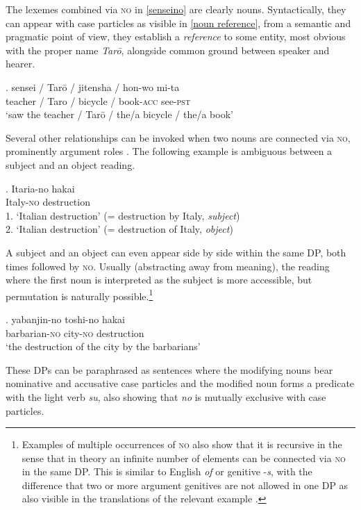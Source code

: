 \documentclass [output=book,colorlinks,citecolor=brown]{langscibook}
\begin{document}
The lexemes combined via \textsc{no} in \ref{senseino} are clearly nouns. Syntactically, they can appear with case particles as visible in \ref{noun reference}, from a semantic and pragmatic point of view, they establish a \textit{reference} to some entity, most obvious with the proper name \textit{Tarō}, alongside common ground between speaker and hearer.

\exg. sensei / Tarō / jitensha / hon-wo mi-ta\\
teacher / Taro / bicycle / book-\textsc{acc} see-\textsc{pst}\\
`saw the teacher / Tarō / the/a bicycle / the/a book’ \label{noun reference}

Several other relationships can be invoked when two nouns are connected via \textsc{no}, prominently argument roles \citep{murasugi:1991:noun}. The following example is ambiguous between a subject and an object reading.

\exg. Itaria-no hakai\\
Italy-\textsc{no} destruction\\
1. `Italian destruction' \null \hfill (= destruction by Italy, \textit{subject})\\
2. `Italian destruction' \null \hfill (= destruction of Italy, \textit{object})

A subject and an object can even appear side by side within the same DP, both times followed by \textsc{no}. Usually (abstracting away from meaning), the reading where the first noun is interpreted as the subject is more accessible, but permutation is naturally possible.\footnote{Examples of multiple occurrences of \textsc{no} also show that it is recursive in the sense that in theory an infinite number of elements can be connected via \textsc{no} in the same DP. This is similar to English \textit{of} or genitive -\textit{s}, with the difference that two or more argument genitives are not allowed in one DP as also visible in the translations of the relevant example \citep[86]{murasugi:1991:noun}.}

\exg. yabanjin-no toshi-no hakai\\
barbarian-\textsc{no} city-\textsc{no} destruction\\
`the destruction of the city by the barbarians’ \hfill \citep[7]{murasugi:1991:noun}

These DPs can be paraphrased as sentences where the modifying nouns bear nominative and accusative case particles and the modified noun forms a predicate with the light verb \textit{su}, also showing that \textit{no} is mutually exclusive with case particles.
\end{document}
